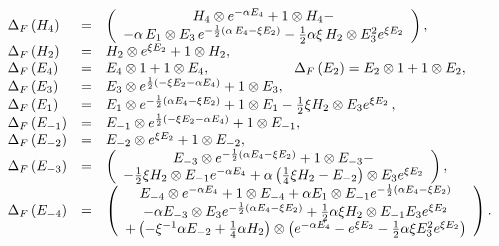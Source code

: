 \documentclass[a4paper,12pt,showkeys]{article}
\begin{document}
\begin{equation}
\begin{array}{lcl}
\Delta _{F}\left( H_{4}\right)  & = & \left(
\begin{array}{c}
H_{4}\otimes e^{-\alpha { E }_{4}}+1\otimes H_{4}-
\\
-\alpha \, E_1 \otimes E_3 \, e^{-\frac{1}{2}
\left( \alpha \,{ E }_{4}-\xi{ E }%
_{2}\right) }-\frac{1}{2}\alpha \xi
 \,H_{2}\otimes E_3^{2}e^{\xi{ E }_{2}}%
\end{array}%
\right) ,
 \\
\Delta _{F}\left( H_{2}\right)  & = & H_{2}\otimes e^{\xi{ E }%
_{2}}+1\otimes H_{2},
\\
\Delta _{F}\left( { E }_{4}\right)  & = & { E }%
_{4}\otimes 1+1\otimes { E }_{4},
\qquad\qquad\qquad
\Delta _{F}\left( {E }_{2}\right)   =  { E } _{2}\otimes 1+1\otimes { E }_{2},
\\
\Delta _{F}\left( E_3\right)
 & = & E_3\otimes e^{\frac{1}{2}\left(- \xi {E }%
_{2}- \alpha { E }_{4}\right) }+1\otimes E_3,
\\
\Delta _{F}\left( E_1\right)
 & = &
 E_1\otimes e^{-\frac{1}{2}\left(  \alpha { E
}_{4}- \xi { E }_{2}\right) }+1\otimes E_1- \frac{1}{2} \xi
H_{2}\otimes E_{3} e^{\xi { E }_{2}}\, ,
\\
\Delta _{F}\left( E_{-1}\right)
  & = & E_{-1}\otimes e^{\frac{1}{2}\left(- \xi { %
E }_{2}- \alpha { E }_{4}\right) }+1\otimes E_{-1},
\\
\Delta _{F}\left( E_{-2}\right)  & =
& E_{-2}\otimes e^{ \xi { E }%
_{2}}+1\otimes E_{-2}, \\
\Delta _{F}\left( E_{-3}\right)  & = & \left(
\begin{array}{c}
E_{-3}\otimes e^{-\frac{1}{2}\left( \alpha { E }_{4}
- \xi { E }%
_{2}\right) }+1\otimes E_{-3}- \\
-  \frac{1}{2} \xi H_{2}\otimes E_{-1}e^{-\alpha E_{4}}
+  \alpha \left(\frac{1}{4}\xi H_2 - E_{-2}\right)
\otimes E_3 e^{ \xi { E }_{2}}%
\end{array}%
\right) , \\
\Delta _{F}\left( E_{-4}\right)  & = & \left(
\begin{array}{c}
E_{-4}\otimes e^{- \alpha { E }_{4}}
+1\otimes E_{-4}+ \alpha E_1\otimes E_{-1}e^{-\frac{%
1}{2}\left(  \alpha { E }_{4} -\xi { E }_{2}\right) } \\
- \alpha E_{-3}
 \otimes E_3 e^{-\frac{1}{2}\left(  \alpha {E
}_{4}- \xi { E }_{2}\right) }+\frac{1}{2}  \alpha \xi
H_{2}\otimes E_{-1}E_3e^{ \xi { E }_{2}} \\
+\left( - \xi^{-1} \alpha E_{-2}+\frac{1}{4}  \alpha H_{2}\right)
\otimes \left( e^{- \alpha { E }%
_{4}}-e^{\xi { E }_{2}} -\frac{1}{2} \alpha \xi E_3^{2}e^{ \xi {
E }_{2}}\right)
\end{array}%
\right) .%
\end{array}%
\end{equation}
\end{document}

